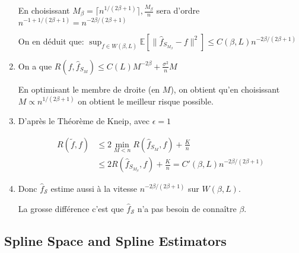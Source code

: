\documentclass[10pt,a4paper,oneside]{article}
\begin{document}
\begin{enumerate}
En choisissant $M_\beta = \lceil n^{1 / (2\beta + 1)} \rceil, \frac{M_\beta}{n}$ sera d'ordre $n^{-1 + 1/(2\beta + 1)} = n^{-2\beta / (2\beta + 1)}$

On en déduit que: $\sup_{f \in W(\beta,L)} \mathbb{E}[\| \hat{f}_{S_{M_\beta}} - f \|^2] \leq C(\beta,L) n^{-2\beta/(2\beta + 1)}$

\item
On a que $R(f,\hat{f}_{S_M}) \leq C(L) M^{-2\beta} + \frac{\sigma^2}{n}M$

En optimisant le membre de droite (en $M$), on obtient qu'en choisissant $M \propto n^{1/(2\beta + 1)}$ on obtient le meilleur risque possible.

\item
D'après le Théorème de Kneip, avec $\epsilon = 1$

\begin{align*}
R(\tilde{f}, f) &\leq 2 \min_{M < n} R(\hat{f}_{S_M}, f) + \frac{K}{n} \\
&\leq 2 R(\hat{f}_{S_{M_\beta}}, f) + \frac{K}{n} = C'(\beta,L) n^{-2\beta/(2\beta + 1)}
\end{align*}

\item
Donc $\hat{f}_\mathcal{S}$ estime aussi à la vitesse $n^{-2\beta/(2\beta + 1)}$ sur $W(\beta, L)$.

La grosse différence c'est que $\hat{f}_\mathcal{S}$ n'a pas besoin de connaître $\beta$.
\end{enumerate}

\subsection{Spline Space and Spline Estimators}
\end{document}
